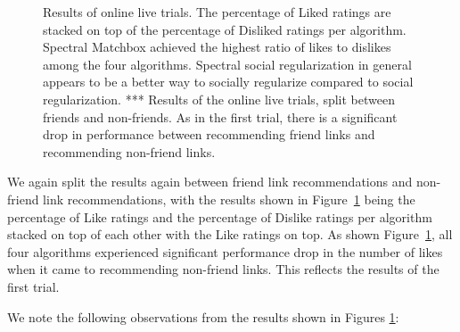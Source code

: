 \begin{figure}[t!]
\caption{Results of online live trials. The percentage of Liked
ratings are stacked on top of the percentage of Disliked ratings per
algorithm. Spectral Matchbox achieved the highest ratio of likes to
dislikes among the four algorithms. Spectral social regularization in
general appears to be a better way to socially regularize compared to
social regularization. *** Results of the online live trials, split
between friends and non-friends. As in the first trial, there is a
significant drop in performance between recommending friend links and
recommending non-friend links.}
\label{fig:online2}
\end{figure}

We again split the results again between friend link recommendations
and non-friend link recommendations, with the results shown in
Figure~\ref{fig:online2} being the percentage of Like ratings and the
percentage of Dislike ratings per algorithm stacked on top of each
other with the Like ratings on top.  As shown
Figure~\ref{fig:online2}, all four algorithms experienced significant
performance drop in the number of likes when it came to recommending
non-friend links. This reflects the results of the first trial.
 

We note the following observations from the results shown in Figures
\ref{fig:online2}:

